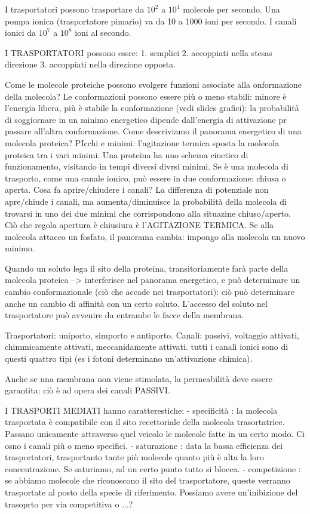 \documentclass[a4paper,12pt]{article}
\begin{document}
I trasportatori possono trasportare da $10^{2}$ a $10^{4}$ molecole per secondo.
Una pompa ionica  (trasportatore pimario) va da 10 a 1000 ioni per secondo.
I canali ionici da $10^{7}$ a $10^{8}$ ioni al secondo.

I TRASPORTATORI possono essre:
1. semplici
2. accoppiati nella stesas direzione
3. accoppiati nella direzione opposta.

Come le molecole proteiche possono svolgere funzioni associate alla onformazione della molecola?
Le conformazioni possono essere più o meno stabili: minore è l'energia libera, più è stabile la conformazione (vedi slides grafici): la probabilità di soggiornare in un minimo energetico dipende dall'energia di attivazione pr passare all'altra conformazione.
Come descriviamo il panorama energetico di una molecola proteica?
PIcchi e minimi: l'agitazione termica sposta la molecola proteica tra i vari minimi. Una proteina ha uno schema cinetico di funzionamento, visitando in tempi diversi divrsi minimi. Se è una molecola di trasporto, come una canale ionico, può essere in due conformazione: chiusa o aperta. Cosa fa aprire/chiudere i canali? La differenza di potenziale non apre/chiude i  canali, ma aumenta/diminuisce la probabilità della molecola di trovarsi in uno dei due minimi che corrispondono alla situazine chiuso/aperto. Ciò che regola apertura è chiusiura è l'AGITAZIONE TERMICA. 
Se alla molecola attacco un fosfato, il panorama cambia: impongo alla molecola un nuovo minimo.

Quando un soluto lega il sito della proteina, transitoriamente farà parte della molecola proteica --> interferisce nel panorama energetico, e può determinare un cambio conformazionale (ciò che accade nei trasportatori): ciò può determinare anche un cambio di affinità con un certo soluto.
L'accesso del soluto nel trasportatore può avvenire da entrambe le facce della membrana.

Trasportatori: uniporto, simporto e antiporto.
Canali: passivi, voltaggio attivati, chimmicamente attivati, meccanidamente attivati. tutti i canali ionici sono di questi quattro tipi (es i fotoni determinano un'attivazione chimica).

Anche se una membrana non viene stimolata, la permeabilità deve essere garantita: ciò è ad opera dei canali PASSIVI.

I TRASPORTI MEDIATI hanno caratterestiche:
- specificità : la molecola trasportata è compatibile con il sito recettoriale della molecola trasortatrice. Passano unicamente attraverso quel veicolo le molecole fatte in un certo modo. Ci osno i canali più o meno specifici.
- saturazione :  data la bassa efficienza dei trasportatori, trasportanto tante più molecole quanto più è alta la loro concentrazione. Se saturiamo, ad un certo punto tutto si blocca.
- competizione : se abbiamo molecole che riconoscono il sito del trasportatore, queste verranno trasportate al posto della specie di riferimento. Possiamo avere un'inibizione del trasoprto per via competitiva o ...?
\end{document}

